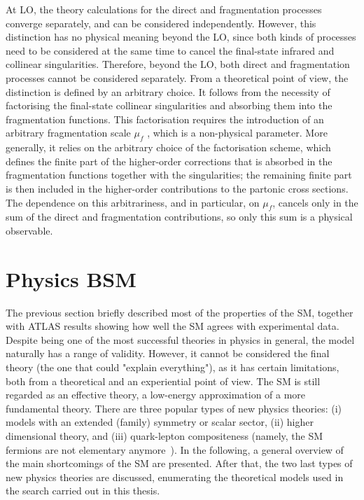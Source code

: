 At \ac{LO}, the theory calculations for the direct and fragmentation processes converge separately, and can be considered independently. However, this distinction has no physical meaning beyond the \ac{LO}, since both kinds of processes need to be considered at the same time to cancel the final-state infrared and collinear singularities. Therefore, beyond the \ac{LO}, both direct and fragmentation processes cannot be considered separately. From a theoretical point of view, the distinction is defined by an arbitrary choice. It follows from the necessity of factorising the final-state collinear singularities and absorbing them into the fragmentation functions. This factorisation requires the introduction of an arbitrary fragmentation scale \(\mu_f\) , which is a non-physical parameter. More generally, it relies on the arbitrary choice of the factorisation scheme, which defines the finite part of the higher-order corrections that is absorbed in the fragmentation functions together with the singularities; the remaining finite part is then included in the higher-order contributions to the partonic cross sections. The dependence on this arbitrariness, and in particular, on \(\mu_f\), cancels only in the sum of the direct and fragmentation contributions, so only this sum is a physical observable.






\section{Physics \acf{BSM}}
\label{sec:theory:bsm}

The previous section briefly described most of the properties of the \ac{SM}, together with \ac{ATLAS} results showing how well the \ac{SM} agrees with experimental data. Despite being one of the most successful theories in physics in general, the model naturally has a range of validity.
However, it cannot be considered the final theory (the one that could "explain everything"), as it has certain limitations, both from a theoretical and an experiential point of view. The \ac{SM} is still regarded as an effective theory, a low-energy approximation of a more fundamental theory. There are three popular types of new physics theories: (i) models with an extended (family) symmetry or scalar sector, (ii) higher dimensional theory, and (iii) quark-lepton compositeness (namely, the \ac{SM} fermions are not elementary anymore~\cite{Kuhn_Zherwas-1984,Cabibbo_Maiani_Srivastava-1984,DeRújula_Maiani_Petronzio-1984,Baur_Spira_Zerwas-1990,Bhattacharya_Chauhan_Choudhary_Choudhury-2009,Zhan_Li_Liu_Li-2016}).
In the following, a general overview of the main shortcomings of the \ac{SM} are presented. After that, the two last types of new physics theories are discussed, enumerating the theoretical models used in the search carried out in this thesis.

